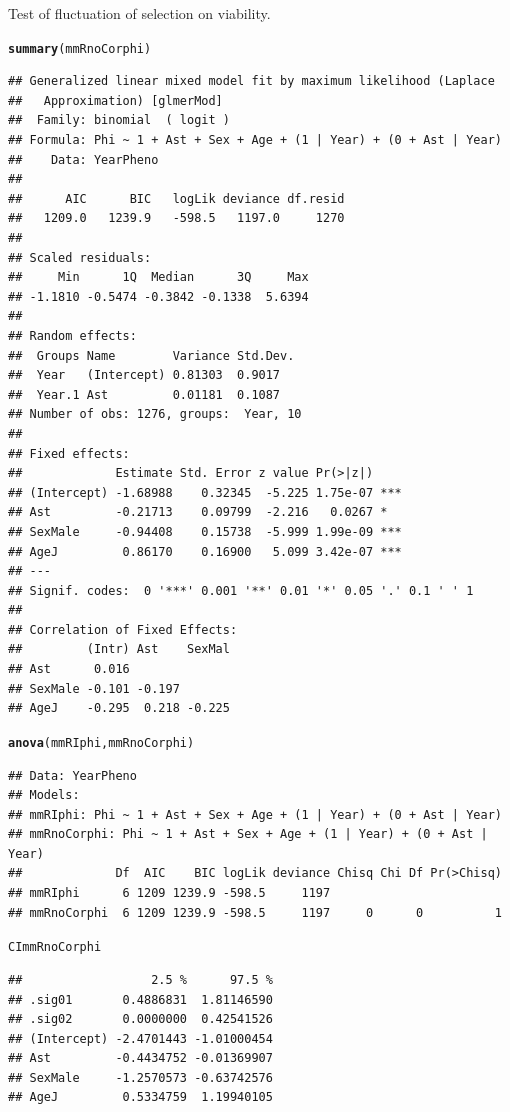 \documentclass{article}\usepackage[]{graphicx}\usepackage[]{color}
\makeatletter
\newcommand{\hlstd}[1]{\textcolor[rgb]{0.345,0.345,0.345}{#1}}%
\newcommand{\hlkwd}[1]{\textcolor[rgb]{0.737,0.353,0.396}{\textbf{#1}}}%
\newenvironment{kframe}{%
 \def\at@end@of@kframe{}%
 \ifinner\ifhmode%
  \def\at@end@of@kframe{\end{minipage}}%
  \begin{minipage}{\columnwidth}%
 \fi\fi%
 \def\FrameCommand##1{\hskip\@totalleftmargin \hskip-\fboxsep
 \colorbox{shadecolor}{##1}\hskip-\fboxsep
     \hskip-\linewidth \hskip-\@totalleftmargin \hskip\columnwidth}%
 \MakeFramed {\advance\hsize-\width
   \@totalleftmargin\z@ \linewidth\hsize
   \@setminipage}}%
 {\par\unskip\endMakeFramed%
 \at@end@of@kframe}
\newenvironment{knitrout}{}{} %
\makeatother
\begin{document}
Test of fluctuation of selection on viability.
\begin{knitrout}
\color{fgcolor}\begin{kframe}
\begin{alltt}
\hlkwd{summary}\hlstd{(mmRnoCorphi)}
\end{alltt}
\begin{verbatim}
## Generalized linear mixed model fit by maximum likelihood (Laplace
##   Approximation) [glmerMod]
##  Family: binomial  ( logit )
## Formula: Phi ~ 1 + Ast + Sex + Age + (1 | Year) + (0 + Ast | Year)
##    Data: YearPheno
## 
##      AIC      BIC   logLik deviance df.resid 
##   1209.0   1239.9   -598.5   1197.0     1270 
## 
## Scaled residuals: 
##     Min      1Q  Median      3Q     Max 
## -1.1810 -0.5474 -0.3842 -0.1338  5.6394 
## 
## Random effects:
##  Groups Name        Variance Std.Dev.
##  Year   (Intercept) 0.81303  0.9017  
##  Year.1 Ast         0.01181  0.1087  
## Number of obs: 1276, groups:  Year, 10
## 
## Fixed effects:
##             Estimate Std. Error z value Pr(>|z|)    
## (Intercept) -1.68988    0.32345  -5.225 1.75e-07 ***
## Ast         -0.21713    0.09799  -2.216   0.0267 *  
## SexMale     -0.94408    0.15738  -5.999 1.99e-09 ***
## AgeJ         0.86170    0.16900   5.099 3.42e-07 ***
## ---
## Signif. codes:  0 '***' 0.001 '**' 0.01 '*' 0.05 '.' 0.1 ' ' 1
## 
## Correlation of Fixed Effects:
##         (Intr) Ast    SexMal
## Ast      0.016              
## SexMale -0.101 -0.197       
## AgeJ    -0.295  0.218 -0.225
\end{verbatim}
\begin{alltt}
\hlkwd{anova}\hlstd{(mmRIphi,mmRnoCorphi)}
\end{alltt}
\begin{verbatim}
## Data: YearPheno
## Models:
## mmRIphi: Phi ~ 1 + Ast + Sex + Age + (1 | Year) + (0 + Ast | Year)
## mmRnoCorphi: Phi ~ 1 + Ast + Sex + Age + (1 | Year) + (0 + Ast | Year)
##             Df  AIC    BIC logLik deviance Chisq Chi Df Pr(>Chisq)
## mmRIphi      6 1209 1239.9 -598.5     1197                        
## mmRnoCorphi  6 1209 1239.9 -598.5     1197     0      0          1
\end{verbatim}
\begin{alltt}
\hlstd{CImmRnoCorphi}
\end{alltt}
\begin{verbatim}
##                  2.5 %      97.5 %
## .sig01       0.4886831  1.81146590
## .sig02       0.0000000  0.42541526
## (Intercept) -2.4701443 -1.01000454
## Ast         -0.4434752 -0.01369907
## SexMale     -1.2570573 -0.63742576
## AgeJ         0.5334759  1.19940105
\end{verbatim}
\end{kframe}
\end{knitrout}
\end{document}
